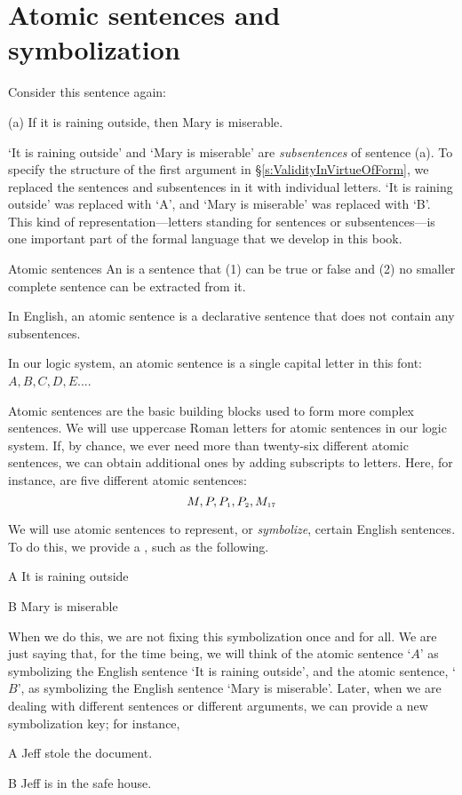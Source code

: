 \filbreak
\section{Atomic sentences and symbolization}\label{s:atomic}

Consider this sentence again:
	\begin{earg}
		\item[(a)] If it is raining outside, then Mary is miserable.
	\end{earg}
`It is raining outside' and `Mary is miserable' are \textit{subsentences} of sentence (a). To specify the structure of the first argument in \S\ref{s:ValidityInVirtueOfForm}, we replaced the sentences and subsentences in it with individual letters. `It is raining outside' was replaced with `A', and `Mary is miserable' was replaced with `B'. This kind of representation---letters standing for sentences or subsentences---is one important part of the formal language that we develop in this book.

\begin{factboxy}{Atomic sentences}
An  is a sentence that (1) can be true or false and (2) no smaller complete sentence can be extracted from it.\medskip

In English, an atomic sentence is a declarative sentence that does not contain any subsentences.\smallskip

In our logic system, an atomic sentence is a single capital letter in this font: $A, B, C, D, E . . .$.
\end{factboxy}

Atomic sentences are the basic building blocks used to form more complex sentences. We will use uppercase Roman letters for atomic sentences in our logic system. If, by chance, we ever need more than twenty-six different atomic sentences, we can obtain additional ones by adding subscripts to letters. Here, for instance, are five different atomic sentences:
	$$M, P, P_{\text{\tiny 1}}, P_{\text{\tiny 2}}, M_{\text{\tiny 17}}$$

We will use atomic sentences to represent, or \emph{symbolize}, certain English sentences. To do this, we provide a , such as the following.
	\begin{ekey}
		\item[A] It is raining outside
		\item[B] Mary is miserable
	\end{ekey}
When we do this, we are not fixing this symbolization once and for all. We are just saying that, for the time being, we will think of the atomic sentence `$A$' as symbolizing the English sentence `It is raining outside', and the atomic sentence, `$B$', as symbolizing the English sentence `Mary is miserable'. Later, when we are dealing with different sentences or different arguments, we can provide a new symbolization key; for instance, 
	\begin{ekey}
		\item[A] Jeff stole the document.
		\item[B] Jeff is in the safe house.
	\end{ekey}



